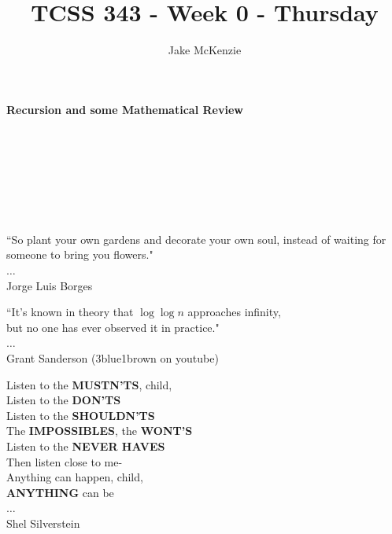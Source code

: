 \documentclass[12pt]{article}
\begin{document}
\title{TCSS 343 - Week 0 - Thursday}
\author{Jake McKenzie}
\maketitle
\noindent\centerline{\textbf{Recursion and some Mathematical Review}}\\\\\\\\\\\\
\begin{center}
    ``So plant your own gardens and decorate your own soul, instead of waiting for someone to bring you flowers." \\$\dots$\\ Jorge Luis Borges
\end{center}
\begin{center}
    ``It's known in theory that $\log{\log{n}}$ approaches infinity, \\but no one has ever observed it in practice." \\$\dots$\\ Grant Sanderson (3blue1brown on youtube)
\end{center}
\begin{center}
Listen to the \textbf{MUSTN'TS}, child,\\
Listen to the \textbf{DON'TS}\\
Listen to the \textbf{SHOULDN'TS}\\
The \textbf{IMPOSSIBLES}, the \textbf{WONT'S}\\
Listen to the \textbf{NEVER HAVES}\\
Then listen close to me-\\
Anything can happen, child,\\
\textbf{ANYTHING} can be\\ 
$\dots$\\
Shel Silverstein 
\end{center}
\newpage
\end{document}
